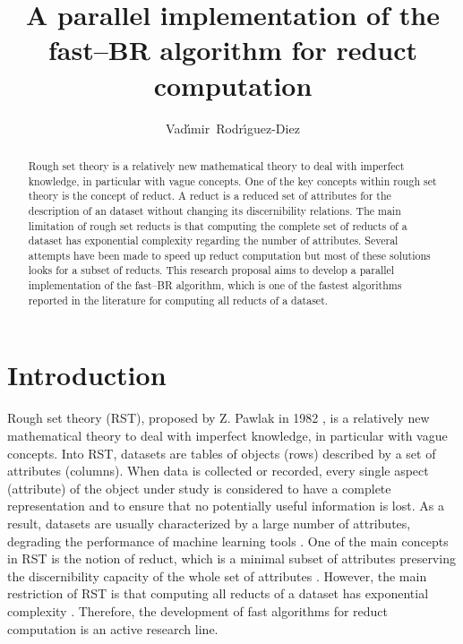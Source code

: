 \documentclass[citenumber]{elsarticle}
\begin{document}
%
\title{A parallel implementation of the fast--BR algorithm for reduct computation}

	\author[inaoe,uc]{Vad\'{\i}mir~Rodr\'{\i}guez-Diez}
	\address[inaoe]{Computer Science Department\\
					Instituto Nacional de Astrof\'{\i}sica, \'{O}ptica y Electr\'{o}nica\\
					Luis Enrique Erro \# 1, Santa Mar\'{\i}a Tonantzintla, Puebla, 72840, M\'{e}xico} 
	\address[uc]{Electrical Engineering Department\\
				 Universidad de Camag\"{u}ey\\
				 Circv. Nte. km 5$\frac{1}{2}$, Camag\"{u}ey, Cuba}

%
\begin{abstract}
%
	Rough set theory is a relatively new mathematical theory to deal with imperfect knowledge, in particular with vague concepts. One of the key concepts within rough set theory is the concept of reduct. A reduct is a reduced set of attributes for the description of an dataset without changing its discernibility relations. The main limitation of rough set reducts is that computing the complete set of reducts of a dataset has exponential complexity regarding the number of attributes. Several attempts have been made to speed up reduct computation but most of these solutions looks for a subset of reducts.  This research proposal aims to develop a parallel implementation of the fast--BR algorithm, which is one of the fastest algorithms reported in the literature for computing all reducts of a dataset.
%
\end{abstract}
%
	\maketitle
%
\section{Introduction}
%
	Rough set theory (RST), proposed by Z. Pawlak in 1982 \cite{Pawlak81}, is a relatively new mathematical theory to deal with imperfect knowledge, in particular with vague concepts. Into RST, datasets are tables of objects (rows) described by a set of attributes (columns). When data is collected or recorded, every single aspect (attribute) of the object under study is considered to have a complete representation and to ensure that no potentially useful information is lost. As a result, datasets are usually characterized by a large number of attributes,  degrading the performance of machine learning tools \cite{Parthalain08}. One of the main concepts in RST is the notion of reduct, which is a minimal subset of attributes preserving the discernibility capacity of the whole set of attributes \cite{Pawlak91}. However, the main restriction of RST is that computing all reducts of a dataset has exponential complexity \cite{Skowron92}. Therefore, the development of fast algorithms for reduct computation is an active research line.
  
\end{document}
